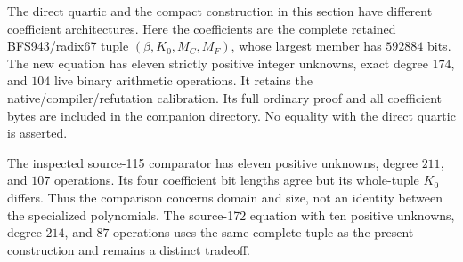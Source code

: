 \label{sec:constant-dilation}
The direct quartic and the compact construction in this section have different
coefficient architectures. Here the coefficients are the complete retained
BFS943/radix67 tuple $(\beta,K_0,M_C,M_F)$, whose largest member has
$592884$ bits. The new equation has eleven strictly positive integer
unknowns, exact degree $174$, and $104$ live binary arithmetic operations.
It retains the native/compiler/refutation calibration. Its full ordinary
proof and all coefficient bytes are included in the companion directory.
No equality with the direct quartic is asserted.

The inspected source-115 comparator has eleven positive unknowns, degree
$211$, and $107$ operations. Its four coefficient bit lengths agree but its
whole-tuple $K_0$ differs. Thus the comparison concerns domain and size,
not an identity between the specialized polynomials. The source-172 equation
with ten positive unknowns, degree $214$, and $87$ operations uses the same
complete tuple as the present construction and remains a distinct tradeoff.

